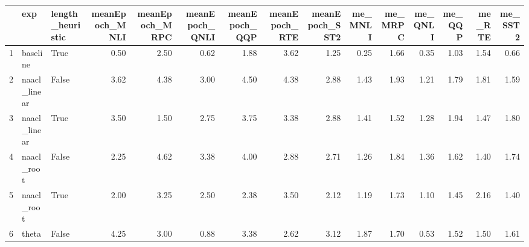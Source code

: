 \begin{table}[ht]
\centering
\begin{tabular}{rllrrrrrrrrrrrr}
  \hline
 & exp & length\_heuristic & meanEpoch\_MNLI & meanEpoch\_MRPC & meanEpoch\_QNLI & meanEpoch\_QQP & meanEpoch\_RTE & meanEpoch\_SST2 & me\_MNLI & me\_MRPC & me\_QNLI & me\_QQP & me\_RTE & me\_SST2 \\ 
  \hline
1 & baseline & True & 0.50 & 2.50 & 0.62 & 1.88 & 3.62 & 1.25 & 0.25 & 1.66 & 0.35 & 1.03 & 1.54 & 0.66 \\ 
  2 & naacl\_linear & False & 3.62 & 4.38 & 3.00 & 4.50 & 4.38 & 2.88 & 1.43 & 1.93 & 1.21 & 1.79 & 1.81 & 1.59 \\ 
  3 & naacl\_linear & True & 3.50 & 1.50 & 2.75 & 3.75 & 3.38 & 2.88 & 1.41 & 1.52 & 1.28 & 1.94 & 1.47 & 1.80 \\ 
  4 & naacl\_root & False & 2.25 & 4.62 & 3.38 & 4.00 & 2.88 & 2.71 & 1.26 & 1.84 & 1.36 & 1.62 & 1.40 & 1.74 \\ 
  5 & naacl\_root & True & 2.00 & 3.25 & 2.50 & 2.38 & 3.50 & 2.12 & 1.19 & 1.73 & 1.10 & 1.45 & 2.16 & 1.40 \\ 
  6 & theta & False & 4.25 & 3.00 & 0.88 & 3.38 & 2.62 & 3.12 & 1.87 & 1.70 & 0.53 & 1.52 & 1.50 & 1.61 \\ 
   \hline
\end{tabular}
\end{table}

